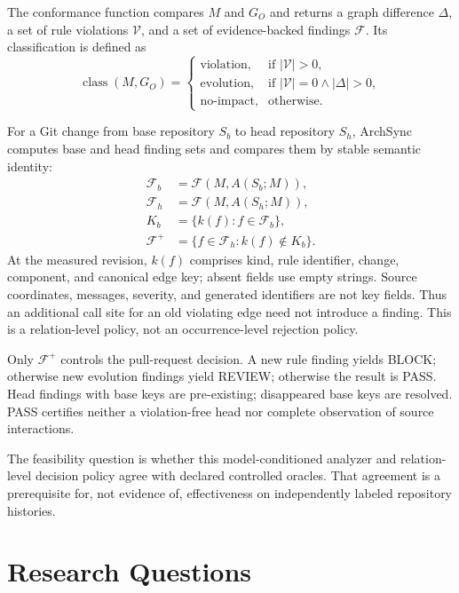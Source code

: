 \documentclass[conference]{IEEEtran}
\begin{document}
The conformance function compares $M$ and $G_O$ and returns a graph difference $\Delta$, a set of rule violations $\mathcal{V}$, and a set of evidence-backed findings $\mathcal{F}$. Its classification is defined as
\begin{equation}
\operatorname{class}(M,G_O)=
\begin{cases}
\text{violation}, & \text{if } |\mathcal{V}| > 0,\\
\text{evolution}, & \text{if } |\mathcal{V}| = 0 \land |\Delta| > 0,\\
\text{no-impact}, & \text{otherwise.}
\end{cases}
\end{equation}

For a Git change from base repository $S_b$ to head repository $S_h$, ArchSync computes base and head finding sets and compares them by stable semantic identity:
\begin{equation}
\begin{aligned}
  \mathcal{F}_b &= \mathcal{F}(M,A(S_b;M)),\\
  \mathcal{F}_h &= \mathcal{F}(M,A(S_h;M)),\\
  K_b &= \{k(f):f\in\mathcal{F}_b\},\\
  \mathcal{F}^{+} &= \{f\in\mathcal{F}_h:k(f)\notin K_b\}.
\end{aligned}
\end{equation}
At the measured revision, $k(f)$ comprises kind, rule identifier, change, component, and canonical edge key; absent fields use empty strings. Source coordinates, messages, severity, and generated identifiers are not key fields. Thus an additional call site for an old violating edge need not introduce a finding. This is a relation-level policy, not an occurrence-level rejection policy.

Only $\mathcal{F}^{+}$ controls the pull-request decision. A new rule finding yields BLOCK; otherwise new evolution findings yield REVIEW; otherwise the result is PASS. Head findings with base keys are pre-existing; disappeared base keys are resolved. PASS certifies neither a violation-free head nor complete observation of source interactions.

The feasibility question is whether this model-conditioned analyzer and relation-level decision policy agree with declared controlled oracles. That agreement is a prerequisite for, not evidence of, effectiveness on independently labeled repository histories.

\section{Research Questions}
\end{document}
